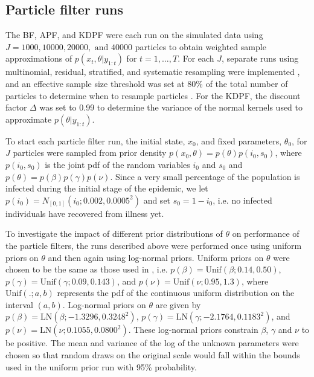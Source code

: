 \documentclass{elsarticle}
\begin{document}
\subsection{Particle filter runs} \label{sec:pf}

The BF, APF, and KDPF were each run on the simulated data using $J = 1000, 10000, 20000, \mbox{ and } 40000$ particles to obtain weighted sample approximations of $p(x_t,\theta|y_{1:t})$ for $t = 1,\ldots,T$. For each $J$, separate runs using multinomial, residual, stratified, and systematic resampling were implemented \citep{smcUtils}, and an effective sample size threshold was set at 80\% of the total number of particles to determine when to resample particles \citep{Liu:Chen:Wong:reje:1998}. For the KDPF, the discount factor $\Delta$ was set to 0.99 to determine the variance of the normal kernels used to approximate $p(\theta|y_{1:t})$.

To start each particle filter run, the initial state, $x_0$, and fixed parameters, $\theta_0$, for $J$ particles were sampled from prior density $p(x_0,\theta) = p(\theta)p(i_0,s_0)$, where $p(i_0,s_0)$ is the joint pdf of the random variables $i_0$ and $s_0$ and $p(\theta) = p(\beta)p(\gamma)p(\nu)$. Since a very small percentage of the population is infected during the initial stage of the epidemic, we let $p(i_0) = N_{[0,1]}(i_0;0.002,0.0005^2)$ and set $s_0 = 1 - i_0$, i.e. no infected individuals have recovered from illness yet.

To investigate the impact of different prior distributions of $\theta$ on performance of the particle filters, the runs described above were performed once using uniform priors on $\theta$ and then again using log-normal priors. Uniform priors on $\theta$ were chosen to be the same as those used in \citet{skvortsov2012monitoring}, i.e. \hbox{$p(\beta) = \mbox{Unif}(\beta; 0.14, 0.50)$}, \hbox{$p(\gamma) = \mbox{Unif}(\gamma; 0.09, 0.143)$}, and \hbox{$p(\nu) = \mbox{Unif}(\nu; 0.95, 1.3)$}, where $\mbox{Unif}(.; a, b)$ represents the pdf of the continuous uniform distribution on the interval $(a,b)$. Log-normal priors on $\theta$ are given by \hbox{$p(\beta) = \mbox{LN}(\beta; -1.3296, 0.3248^2)$}, \hbox{$p(\gamma) = \mbox{LN}(\gamma; -2.1764, 0.1183^2)$}, and \hbox{$p(\nu) = \mbox{LN}(\nu; 0.1055, 0.0800^2)$}. These log-normal priors constrain $\beta$, $\gamma$ and $\nu$ to be positive. The mean and variance of the log of the unknown parameters were chosen so that random draws on the original scale would fall within the bounds used in the uniform prior run with 95\% probability.
\end{document}
